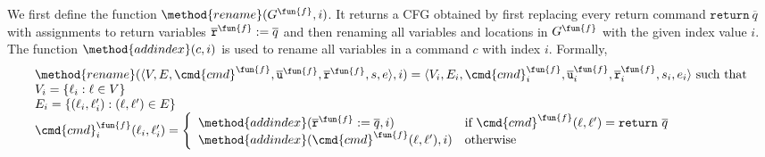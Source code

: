 We first define the function $\method{rename}(G^\fun{f},i)$.
It returns a CFG obtained by first replacing every return command
$\mathtt{return}\ \overline{q}$ with assignments to return variables
$\overline{\texttt{r}}^\fun{f} := \overline{q}$ and then renaming all variables
and locations in $G^\fun{f}$ with the given index value $i$.
The function $\method{addindex}(c, i)$ is used to rename all variables in a
command $c$ with index $i$.
Formally,
\[
\begin{array}{l}
\method{rename}(\langle V, E,\cmd{cmd}^\fun{f},\overline{\texttt{u}}^\fun{f},
\overline{\texttt{r}}^\fun{f},s,e \rangle,i)
= \langle V_i, E_i,\cmd{cmd}_i^\fun{f},\overline{\texttt{u}}_i^\fun{f},
\overline{\texttt{r}}_i^\fun{f},s_i,e_i \rangle \text{ such that}\\

V_i = \{\ell_i:\ell \in V\} \\

E_i = \{(\ell_i,\ell'_i): (\ell,\ell') \in E\} \\

\cmd{cmd}_i^\fun{f}(\ell_i,\ell'_i) =
  \left\{
  \begin{array}{ll}
   \method{addindex}(\overline{\texttt{r}}^\fun{f}:=\overline{q}, i) &
     \text{if }\cmd{cmd}^\fun{f}(\ell,\ell')=\mathtt{return}\ \overline{q} \\
   \method{addindex}(\cmd{cmd}^\fun{f}(\ell,\ell'), i) &
     \text{otherwise}
  \end{array}
  \right.
\end{array}
\]


